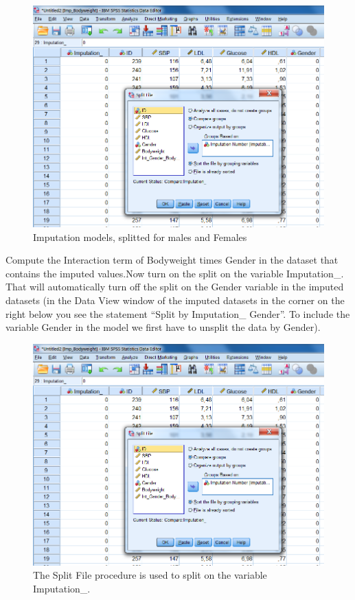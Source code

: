 \documentclass[]{book}
\begin{document}
\begin{figure}

{\centering \includegraphics[width=0.9\linewidth]{images/fig6.4} 

}

\caption{Imputation models, splitted for males and Females}\label{fig:fig6-4}
\end{figure}

Compute the Interaction term of Bodyweight times Gender in the dataset
that contains the imputed values.Now turn on the split on the variable
Imputation\_. That will automatically turn off the split on the Gender
variable in the imputed datasets (in the Data View window of the imputed
datasets in the corner on the right below you see the statement ``Split
by Imputation\_ Gender''. To include the variable Gender in the model we
first have to unsplit the data by Gender).

\begin{figure}

{\centering \includegraphics[width=0.9\linewidth]{images/fig6.4} 

}

\caption{The Split File procedure is used to split on the variable Imputation_.}\label{fig:fig6-5}
\end{figure}
\end{document}
